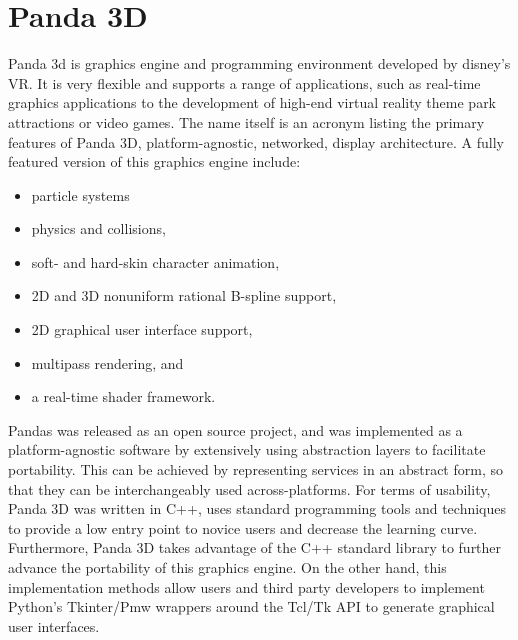 \documentclass[
	12pt, 
	a4paper, 
]{article}
\begin{document}
	\section{Panda 3D}
	Panda 3d is graphics engine and programming environment developed by disney's VR. It is very flexible and supports a range of applications, such as real-time graphics applications to the development of high-end virtual reality theme park attractions or video games. The name itself is an acronym listing the primary features of Panda 3D, platform-agnostic, networked, display architecture\cite{goslin2004panda3d}. A fully featured version of this graphics engine include\cite{goslin2004panda3d}:
	\begin{itemize}
		\item particle systems
		\item physics and collisions,
		\item soft- and hard-skin character animation,
		\item 2D and 3D nonuniform rational B-spline support,
		\item 2D graphical user interface support,
		\item multipass rendering, and
		\item a real-time shader framework.
	\end{itemize}
	Pandas was released as an open source project, and was implemented as a platform-agnostic software by extensively using abstraction layers to facilitate portability. This can be achieved by representing services in an abstract form, so that they can be interchangeably used across-platforms. For terms of usability, Panda 3D was written in C++, uses standard programming tools and techniques to provide a low entry point to novice users and decrease the learning curve. Furthermore, Panda 3D takes advantage of the C++ standard library to further advance the portability of this graphics engine. On the other hand, this implementation methods allow users and third party developers to implement Python’s Tkinter/Pmw wrappers around the Tcl/Tk API to generate graphical user interfaces\cite{goslin2004panda3d}.
	\printbibliography
\end{document}
